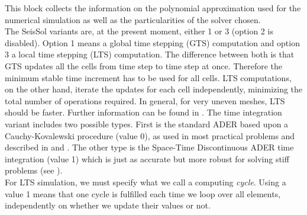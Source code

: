 \documentclass[12pt,twoside]{article}
\begin{document}
This block collects the information on the polynomial approximation used for the numerical simulation 
as well as the particularities of the solver chosen. \\
The SeisSol variants are, at the present moment, either 1 or 3 (option 2 is disabled).
Option 1 means a global time stepping (GTS) computation and option 3 a local time stepping (LTS) computation.
The difference between both is that GTS updates all the cells from time step to time step at once. 
Therefore the minimum stable time increment has to be used for all cells. 
LTS computations, on the other hand, iterate the updates for each cell independently, 
minimizing the total number of operations required. 
In general, for very uneven meshes, LTS should be faster. 
Further information can be found in \cite{DumbserKaeserToro07}. 
The time integration variant includes two possible types.
First is the standard ADER based upon a Cauchy-Kovalewski procedure (value 0), as used in most practical problems and 
described in \cite{KaeserDumbser06} and \cite{DumbserKaeser06}. 
The other type is the Space-Time Discontinuous ADER time integration (value 1) which is just as accurate but 
more robust for solving stiff problems (see \cite{PuenteDumbserKaeserIgel07}). \\
For LTS simulation, we must specify what we call a computing \textit{cycle}.
Using a value 1 means that one cycle is fulfilled each time we loop over all elements, 
independently on whether we update their values or not.
\end{document}
